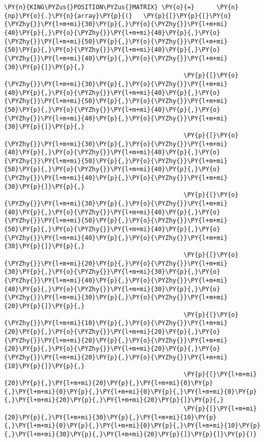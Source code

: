 \begin{Verbatim}[commandchars=\\\{\}]
         \PY{n}{KING\PYZus{}POSITION\PYZus{}MATRIX} \PY{o}{=}      \PY{n}{np}\PY{o}{.}\PY{n}{array}\PY{p}{(}   \PY{p}{[}\PY{p}{[}\PY{o}{\PYZhy{}}\PY{l+m+mi}{30}\PY{p}{,}\PY{o}{\PYZhy{}}\PY{l+m+mi}{40}\PY{p}{,}\PY{o}{\PYZhy{}}\PY{l+m+mi}{40}\PY{p}{,}\PY{o}{\PYZhy{}}\PY{l+m+mi}{50}\PY{p}{,}\PY{o}{\PYZhy{}}\PY{l+m+mi}{50}\PY{p}{,}\PY{o}{\PYZhy{}}\PY{l+m+mi}{40}\PY{p}{,}\PY{o}{\PYZhy{}}\PY{l+m+mi}{40}\PY{p}{,}\PY{o}{\PYZhy{}}\PY{l+m+mi}{30}\PY{p}{]}\PY{p}{,}
                                                 \PY{p}{[}\PY{o}{\PYZhy{}}\PY{l+m+mi}{30}\PY{p}{,}\PY{o}{\PYZhy{}}\PY{l+m+mi}{40}\PY{p}{,}\PY{o}{\PYZhy{}}\PY{l+m+mi}{40}\PY{p}{,}\PY{o}{\PYZhy{}}\PY{l+m+mi}{50}\PY{p}{,}\PY{o}{\PYZhy{}}\PY{l+m+mi}{50}\PY{p}{,}\PY{o}{\PYZhy{}}\PY{l+m+mi}{40}\PY{p}{,}\PY{o}{\PYZhy{}}\PY{l+m+mi}{40}\PY{p}{,}\PY{o}{\PYZhy{}}\PY{l+m+mi}{30}\PY{p}{]}\PY{p}{,}
                                                 \PY{p}{[}\PY{o}{\PYZhy{}}\PY{l+m+mi}{30}\PY{p}{,}\PY{o}{\PYZhy{}}\PY{l+m+mi}{40}\PY{p}{,}\PY{o}{\PYZhy{}}\PY{l+m+mi}{40}\PY{p}{,}\PY{o}{\PYZhy{}}\PY{l+m+mi}{50}\PY{p}{,}\PY{o}{\PYZhy{}}\PY{l+m+mi}{50}\PY{p}{,}\PY{o}{\PYZhy{}}\PY{l+m+mi}{40}\PY{p}{,}\PY{o}{\PYZhy{}}\PY{l+m+mi}{40}\PY{p}{,}\PY{o}{\PYZhy{}}\PY{l+m+mi}{30}\PY{p}{]}\PY{p}{,}
                                                 \PY{p}{[}\PY{o}{\PYZhy{}}\PY{l+m+mi}{30}\PY{p}{,}\PY{o}{\PYZhy{}}\PY{l+m+mi}{40}\PY{p}{,}\PY{o}{\PYZhy{}}\PY{l+m+mi}{40}\PY{p}{,}\PY{o}{\PYZhy{}}\PY{l+m+mi}{50}\PY{p}{,}\PY{o}{\PYZhy{}}\PY{l+m+mi}{50}\PY{p}{,}\PY{o}{\PYZhy{}}\PY{l+m+mi}{40}\PY{p}{,}\PY{o}{\PYZhy{}}\PY{l+m+mi}{40}\PY{p}{,}\PY{o}{\PYZhy{}}\PY{l+m+mi}{30}\PY{p}{]}\PY{p}{,}
                                                 \PY{p}{[}\PY{o}{\PYZhy{}}\PY{l+m+mi}{20}\PY{p}{,}\PY{o}{\PYZhy{}}\PY{l+m+mi}{30}\PY{p}{,}\PY{o}{\PYZhy{}}\PY{l+m+mi}{30}\PY{p}{,}\PY{o}{\PYZhy{}}\PY{l+m+mi}{40}\PY{p}{,}\PY{o}{\PYZhy{}}\PY{l+m+mi}{40}\PY{p}{,}\PY{o}{\PYZhy{}}\PY{l+m+mi}{30}\PY{p}{,}\PY{o}{\PYZhy{}}\PY{l+m+mi}{30}\PY{p}{,}\PY{o}{\PYZhy{}}\PY{l+m+mi}{20}\PY{p}{]}\PY{p}{,}
                                                 \PY{p}{[}\PY{o}{\PYZhy{}}\PY{l+m+mi}{10}\PY{p}{,}\PY{o}{\PYZhy{}}\PY{l+m+mi}{20}\PY{p}{,}\PY{o}{\PYZhy{}}\PY{l+m+mi}{20}\PY{p}{,}\PY{o}{\PYZhy{}}\PY{l+m+mi}{20}\PY{p}{,}\PY{o}{\PYZhy{}}\PY{l+m+mi}{20}\PY{p}{,}\PY{o}{\PYZhy{}}\PY{l+m+mi}{20}\PY{p}{,}\PY{o}{\PYZhy{}}\PY{l+m+mi}{20}\PY{p}{,}\PY{o}{\PYZhy{}}\PY{l+m+mi}{10}\PY{p}{]}\PY{p}{,}
                                                 \PY{p}{[}\PY{l+m+mi}{20}\PY{p}{,}\PY{l+m+mi}{20}\PY{p}{,}\PY{l+m+mi}{0}\PY{p}{,}\PY{l+m+mi}{0}\PY{p}{,}\PY{l+m+mi}{0}\PY{p}{,}\PY{l+m+mi}{0}\PY{p}{,}\PY{l+m+mi}{20}\PY{p}{,}\PY{l+m+mi}{20}\PY{p}{]}\PY{p}{,}
                                                 \PY{p}{[}\PY{l+m+mi}{20}\PY{p}{,}\PY{l+m+mi}{30}\PY{p}{,}\PY{l+m+mi}{10}\PY{p}{,}\PY{l+m+mi}{0}\PY{p}{,}\PY{l+m+mi}{0}\PY{p}{,}\PY{l+m+mi}{10}\PY{p}{,}\PY{l+m+mi}{30}\PY{p}{,}\PY{l+m+mi}{20}\PY{p}{]}\PY{p}{]}\PY{p}{)}
         

\end{Verbatim}
